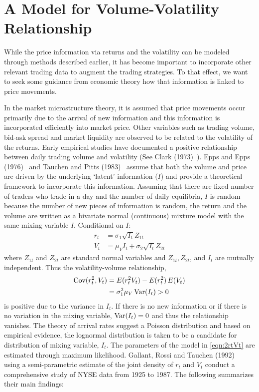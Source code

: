 \section{A Model for Volume-Volatility Relationship \label{s:model_volvol_rel}}


While the price information via returns and the volatility can be modeled through methods described earlier, it has become important to incorporate other relevant trading data to augment the trading strategies. To that effect, we want to seek some guidance from economic theory how that information is linked to price movements.


In the market microstructure theory, it is assumed that price movements occur primarily due to the arrival of new information and this information is incorporated efficiently into market price. Other variables such as trading volume, bid-ask spread and market liquidity are observed to be related to the volatility of the returns. Early empirical studies have documented a positive relationship between daily trading volume and volatility (See Clark (1973)~\cite{clark}). Epps and Epps (1976)~\cite{epps} and Tauchen and Pitts (1983)~\cite{tauchenpitts} assume that both the volume and price are driven by the underlying `latent' information ($I$) and provide a theoretical framework to incorporate this information. Assuming that there are fixed number of traders who trade in a day and the number of daily equilibria, $I$ is random because the number of new pieces of information is random, the return and the volume are written as a bivariate normal (continuous) mixture model with the same mixing variable $I$. Conditional on $I$:
	\begin{equation} \label{eqn:2rtVt}
	\begin{split}
	 r_t&= \sigma_1 \sqrt{I_t}Z_{1t} \\
	 V_t&= \mu_VI_t + \sigma_2 \sqrt{I_t}Z_{2t}
	 \end{split}
	 \end{equation}
where $Z_{1t}$ and $Z_{2t}$ are standard normal variables and $Z_{1t},  Z_{2t}$, and $I_t$ are mutually independent. Thus the volatility-volume relationship,
	\begin{equation} \label{eqn:2covVt}
	\begin{split}
	\cov(r_t^2,V_t)& = E(r_{t}^2V_t) - E(r_t^2) \,E(V_t) \\ 
	&= \sigma_1^2 \mu_V \var(I_t) > 0
	\end{split}
	\end{equation}
is positive due to the variance in $I_t$. If there is no new information or if there is no variation in the mixing variable, $\operatorname{Var}(I_t)= 0$ and thus the relationship vanishes. The theory of arrival rates suggest a
Poisson distribution and based on empirical evidence, the lognormal distribution is taken to be a candidate for distribution of mixing variable, $I_t$. The parameters of the model in \eqref{eqn:2rtVt} are estimated through maximum likelihood. Gallant, Rossi and Tauchen (1992)~\cite{grt} using a semi-parametric estimate of the joint density of $r_t$ and $V_t$ conduct a comprehensive study of NYSE data from 1925 to 1987. The following summarizes their main findings: \twomedskip


